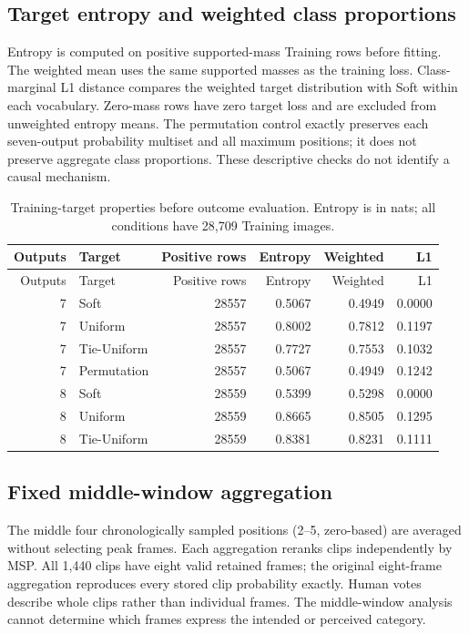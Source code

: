 \subsection{Target entropy and weighted class proportions}
Entropy is computed on positive supported-mass Training rows before fitting. The weighted mean uses the same supported masses as the training loss. Class-marginal L1 distance compares the weighted target distribution with Soft within each vocabulary. Zero-mass rows have zero target loss and are excluded from unweighted entropy means. The permutation control exactly preserves each seven-output probability multiset and all maximum positions; it does not preserve aggregate class proportions. These descriptive checks do not identify a causal mechanism.

\begingroup\small\setlength{\tabcolsep}{4pt}\setlength{\LTcapwidth}{\linewidth}\renewcommand{\arraystretch}{.97}
\begin{longtable}{rlrrrr}
\caption{Training-target properties before outcome evaluation. Entropy is in nats; all conditions have 28,709 Training images.}\label{tab:final-target-audit}\\
\toprule Outputs & Target & Positive rows & Entropy & Weighted & L1\\\midrule\endfirsthead
\toprule Outputs & Target & Positive rows & Entropy & Weighted & L1\\\midrule\endhead
7 & Soft & 28557 & 0.5067 & 0.4949 & 0.0000\\
7 & Uniform & 28557 & 0.8002 & 0.7812 & 0.1197\\
7 & Tie-Uniform & 28557 & 0.7727 & 0.7553 & 0.1032\\
7 & Permutation & 28557 & 0.5067 & 0.4949 & 0.1242\\
8 & Soft & 28559 & 0.5399 & 0.5298 & 0.0000\\
8 & Uniform & 28559 & 0.8665 & 0.8505 & 0.1295\\
8 & Tie-Uniform & 28559 & 0.8381 & 0.8231 & 0.1111\\
\bottomrule\end{longtable}\endgroup

\subsection{Fixed middle-window aggregation}
The middle four chronologically sampled positions (2--5, zero-based) are averaged without selecting peak frames. Each aggregation reranks clips independently by MSP. All 1,440 clips have eight valid retained frames; the original eight-frame aggregation reproduces every stored clip probability exactly. Human votes describe whole clips rather than individual frames. The middle-window analysis cannot determine which frames express the intended or perceived category.

